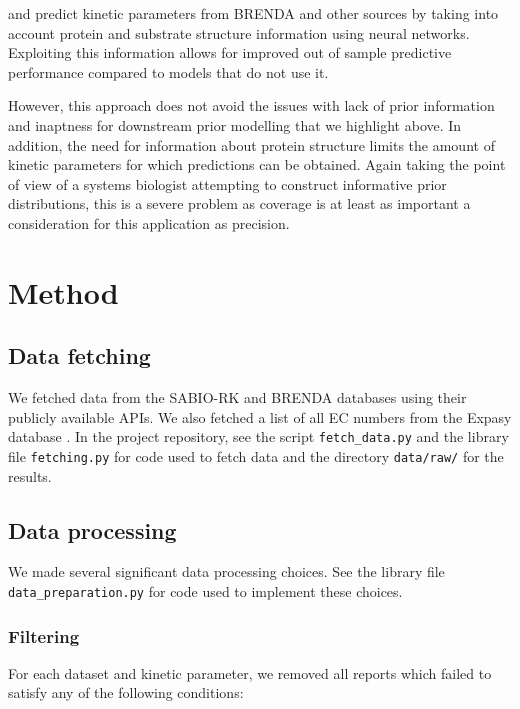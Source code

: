 \documentclass[11pt]{article}
\begin{document}
 and  predict
kinetic parameters from BRENDA and other sources by taking into account protein
and substrate structure information using neural networks. Exploiting this
information allows for improved out of sample predictive performance compared to
models that do not use it.

However, this approach does not avoid the issues with lack of prior information
and inaptness for downstream prior modelling that we highlight above. In
addition, the need for information about protein structure limits the amount of
kinetic parameters for which predictions can be obtained. Again taking the point
of view of a systems biologist attempting to construct informative prior
distributions, this is a severe problem as coverage is at least as important a
consideration for this application as precision.

\section{Method}
\label{sec:org4bebd6f}
\subsection{Data fetching}
\label{sec:orgba54ca3}
We fetched data from the SABIO-RK 
and BRENDA  databases using their publicly
available APIs. We also fetched a list of all EC numbers from the Expasy
database . In the project repository,
see the script \texttt{fetch\_data.py} and the library file \texttt{fetching.py} for code used
to fetch data and the directory \texttt{data/raw/} for the results.

\subsection{Data processing}
\label{sec:orgdfed31c}
We made several significant data processing choices. See the library file
\texttt{data\_preparation.py} for code used to implement these choices.

\subsubsection{Filtering}
\label{sec:org8326023}
For each dataset and kinetic parameter, we removed all reports which failed to
satisfy any of the following conditions:
\end{document}
